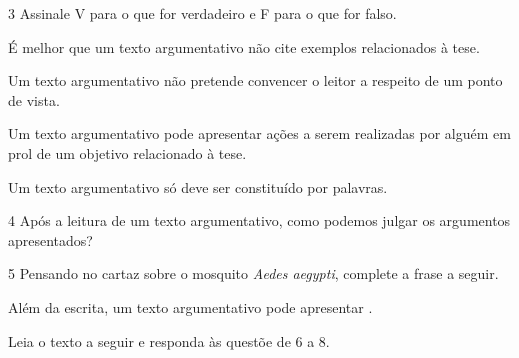 \num{3} Assinale V para o que for verdadeiro e F para o que for falso.

\begin{boxlist}
 É melhor que um texto argumentativo não cite exemplos relacionados à tese.

 Um texto argumentativo não pretende convencer o leitor a respeito de
um ponto de vista.

 Um texto argumentativo pode apresentar ações a serem realizadas por alguém em prol de um objetivo relacionado à tese.

 Um texto argumentativo só deve ser constituído por palavras.
\end{boxlist}

\num{4} Após a leitura de um texto argumentativo, como podemos julgar os argumentos apresentados?



\num{5} Pensando no cartaz sobre o mosquito \textit{Aedes aegypti}, complete a frase a seguir.

Além da escrita, um texto argumentativo pode apresentar \preencher. 

Leia o texto a seguir e responda às questõe de 6 a 8.

